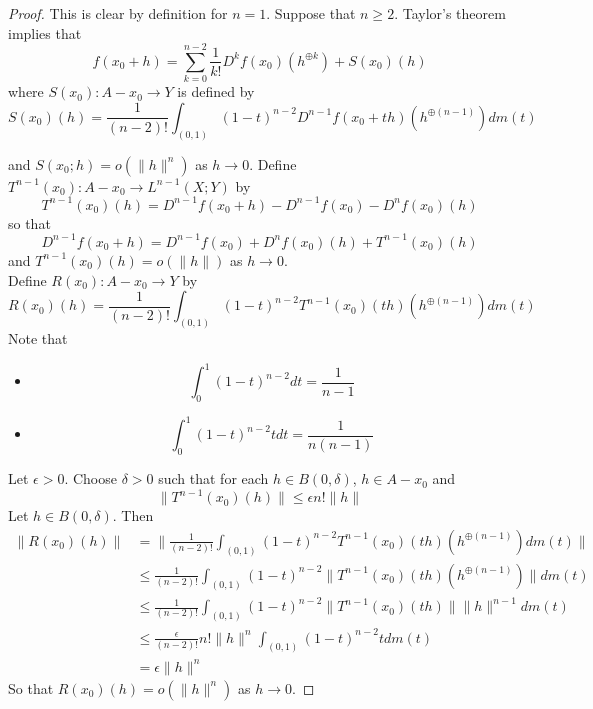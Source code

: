 \documentclass[12pt]{amsart}
\theoremstyle{definition}
\newcommand{\del}{\delta}
\newcommand{\ep}{\epsilon}
\begin{document}
	\begin{proof}
	This is clear by definition for $n = 1$. Suppose that $n \geq 2$. Taylor's theorem implies that $$f(x_0 + h) = \sum_{k=0}^{n-2} \frac{1}{k!} D^k f(x_0)(h^{\oplus k}) + S(x_0)(h)$$ 
	where $S(x_0): A - x_0 \rightarrow Y$ is defined by 
	$$S(x_0)(h) = \frac{1}{(n-2)!}\int_{(0,1)} (1-t)^{n-2}D^{n-1}f(x_0 + th)(h^{\oplus (n-1)})d m(t)$$
	
	and $S(x_0; h) = o(\|h\|^{n})$ as $h \rightarrow 0$.
	Define $T^{n-1}(x_0):A-x_0 \rightarrow L^{n-1}(X;Y)$ by 
	$$T^{n-1}(x_0)(h) = D^{n-1}f(x_0 + h) - D^{n-1}f(x_0) - D^nf(x_0)(h)$$ 
	so that 
	$$D^{n-1}f(x_0 + h) = D^{n-1}f(x_0) + D^nf(x_0)(h) + T^{n-1}(x_0)(h)$$ 
	and $T^{n-1}(x_0)(h) = o(\|h\|)$ as $h \rightarrow 0$. \\
	Define $R(x_0): A - x_0 \rightarrow Y$ by 
	$$R(x_0)(h) = \frac{1}{(n-2)!} \int_{(0,1)} (1-t)^{n-2}T^{n-1}(x_0)(th)(h^{\oplus (n-1)}) dm(t) $$
	Note that 
	\begin{itemize}
	\item $$\int_0^1 (1-t)^{n-2} dt = \frac{1}{n-1}$$
	\item $$\int_0^1 (1-t)^{n-2}t dt = \frac{1}{n(n-1)}$$
	\end{itemize}
	Let $\ep >0$. Choose $\del >0$ such that for each $h \in B(0, \del)$, $h \in A - x_0$ and $$\|T^{n-1}(x_0)(h)\| \leq \ep n! \|h\|$$ Let $h \in B(0, \del)$. Then 
	\begin{align*}
	\|R(x_0)(h)\|
	&= \bigg \|  \frac{1}{(n-2)!} \int_{(0,1)} (1-t)^{n-2}T^{n-1}(x_0)(th)(h^{\oplus (n-1)}) dm(t) \bigg \| \\
	& \leq  \frac{1}{(n-2)!} \int_{(0,1)} (1-t)^{n-2}\|T^{n-1}(x_0)(th)(h^{\oplus (n-1)})\| dm(t) \\
	& \leq  \frac{1}{(n-2)!} \int_{(0,1)} (1-t)^{n-2} \|T^{n-1}(x_0)(th) \| \|h\|^{n-1} dm(t) \\
	& \leq  \frac{\ep}{(n-2)!}  n!  \|h\|^n \int_{(0,1)} (1-t)^{n-2} t  dm(t) \\		
	&= \ep \|h\|^n  
	\end{align*}
	So that $R(x_0)(h) = o(\|h\|^n)$ as $h \rightarrow 0$. 
	

\end{proof}
\end{document}
